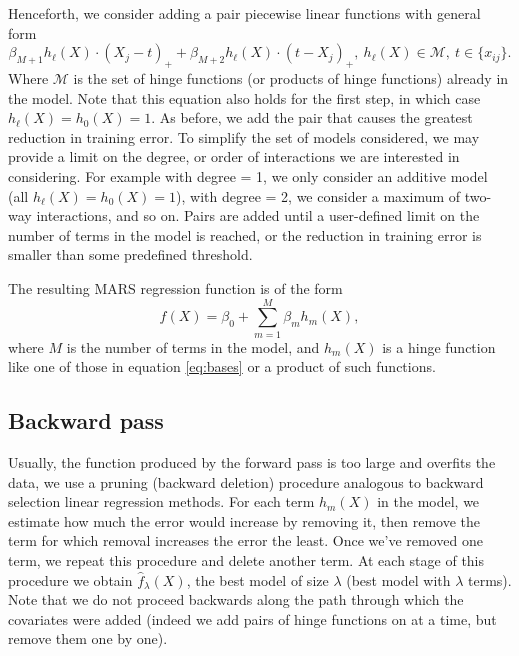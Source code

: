 \documentclass[12pt]{article}
\begin{document}
Henceforth, we consider adding a pair piecewise linear functions with general form
%
\begin{equation} \label{eq:gen-pairs-add}
  \beta_{M + 1} h_{\ell}(X) \cdot (X_{j} - t)_{+} + \beta_{M + 2} h_{\ell}(X) \cdot (t - X_{j})_{+}, \ h_{\ell}(X) \in \mathcal{M}, \ t \in \{x_{ij}\}.
\end{equation}
%
Where $\mathcal{M}$ is the set of hinge functions (or products of hinge functions) already in the model. Note that this equation also holds for the first step, in which case $h_{\ell}(X) = h_{0}(X) = 1$. As before, we add the pair that causes the greatest reduction in training error. To simplify the set of models considered, we may provide a limit on the degree, or order of interactions we are interested in considering. For example with degree = 1, we only consider an additive model (all $h_{\ell}(X) = h_{0}(X) = 1$), with degree = 2, we consider a maximum of two-way interactions, and so on.
Pairs are added until a user-defined limit on the number of terms in the model is reached, or the reduction in training error is smaller than some predefined threshold.

The resulting MARS regression function is of the form
\begin{equation}
  f(X) = \beta_{0} + \sum_{m = 1}^{M} \beta_{m} h_{m}(X),
\end{equation}
where $M$ is the number of terms in the model, and $h_{m}(X)$ is a hinge function like one of those in equation \ref{eq:bases} or a product of such functions.


\subsection{Backward pass} %
\label{sub:backward_pass}

Usually, the function produced by the forward pass is too large and overfits the data, we use a pruning (backward deletion) procedure analogous to backward selection linear regression methods. For each term $h_{m}(X)$ in the model, we estimate how much the error would increase by removing it, then remove the term for which removal increases the error the least. Once we've removed one term, we repeat this procedure and delete another term. At each stage of this procedure we obtain $\hat{f}_{\lambda}(X)$, the best model of size $\lambda$ (best model with $\lambda$ terms). Note that we do not proceed backwards along the path through which the covariates were added (indeed we add pairs of hinge functions on at a time, but remove them one by one).
\end{document}
